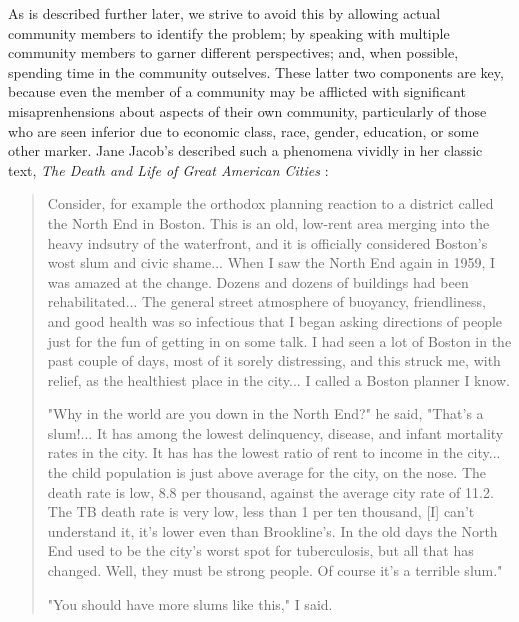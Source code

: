 As is described further later, we strive to avoid this by allowing actual community members to identify the problem; by speaking with multiple community members to garner different perspectives; and, when possible, spending time in the community outselves. These latter two components are key, because even the member of a community may be afflicted with significant misaprenhensions about aspects of their own community, particularly of those who are seen inferior due to economic class, race, gender, education, or some other marker. Jane Jacob's described such a phenomena vividly in her classic text, \textit{The Death and Life of Great American Cities} \cite{jacobsDeathLifeGreat2016}:

\blockquote{Consider, for example the orthodox planning reaction to a district called the North End in Boston. This is an old, low-rent area merging into the heavy indsutry of the waterfront, and it is officially considered Boston's wost slum and civic shame... When I saw the North End again in 1959, I was amazed at the change. Dozens and dozens of buildings had been rehabilitated... The general street atmosphere of buoyancy, friendliness, and good health was so infectious that I began asking directions of people just for the fun of getting in on some talk. I had seen a lot of Boston in the past couple of days, most of it sorely distressing, and this struck me, with relief, as the healthiest place in the city... I called a Boston planner I know.

"Why in the world are you down in the North End?" he said, "That's a slum!... It has among the lowest delinquency, disease, and infant mortality rates in the city. It has has the lowest ratio of rent to income in the city... the child population is just above average for the city, on the nose. The death rate is low, 8.8 per thousand, against the average city rate of 11.2. The TB death rate is very low, less than 1 per ten thousand, [I] can't understand it, it's lower even than Brookline's. In the old days the North End used to be the city's worst spot for tuberculosis, but all that has changed. Well, they must be strong people. Of course it's a terrible slum."

"You should have more slums like this," I said.} 


\section{}

